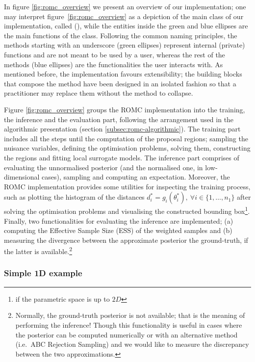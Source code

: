 In figure \ref{fig:romc_overview} we present an overview of our
implementation; one may interpret figure~\ref{fig:romc_overview} as a
depiction of the main class of our implementation, called
(), while the entities inside the green and blue
ellipses are the main functions of the class. Following the common
naming principles, the methods starting with an underscore (green
ellipses) represent internal (private) functions and are not meant to
be used by a user, whereas the rest of the methods (blue ellipses) are
the functionalities the user interacts with. As mentioned before, the
implementation favours extensibility; the building blocks that compose
the method have been designed in an isolated fashion so that a
practitioner may replace them without the method to collapse.

Figure \ref{fig:romc_overview} groups the ROMC implementation into the
training, the inference and the evaluation part, following the
arrangement used in the algorithmic presentation (section
\ref{subsec:romc-algorithmic}). The training part includes all the
steps until the computation of the proposal regions; sampling the
nuisance variables, defining the optimisation problems, solving them,
constructing the regions and fitting local surrogate models. The
inference part comprises of evaluating the unnormalised posterior (and
the normalised one, in low-dimensional cases), sampling and computing
an expectation. Moreover, the ROMC implementation provides some
utilities for inspecting the training process, such as plotting the
histogram of the distances
$d^*_i = g_i(\theta_i^*), \: \forall i \in \{1, \ldots, n_1 \}$ after
solving the optimisation problems and visualising the constructed
bounding box\footnote{if the parametric space is up to $2D$}. Finally,
two functionalities for evaluating the inference are implemented; (a)
computing the Effective Sample Size (ESS) of the weighted samples and
(b) measuring the divergence between the approximate posterior the
ground-truth, if the latter is available.\footnote{Normally, the
  ground-truth posterior is not available; that is the meaning of
  performing the inference!  Though this functionality is useful in
  cases where the posterior can be computed numerically or with an
  alternative method (i.e.\ ABC Rejection Sampling) and we would like
  to measure the discrepancy between the two approximations.}


\subsubsection*{Simple 1D example}

